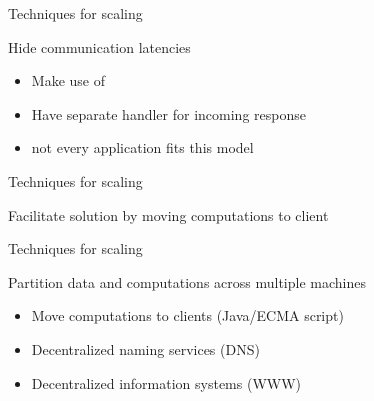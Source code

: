 \begin{slide}{Techniques for scaling}
  \begin{block}{Hide communication latencies}
    \begin{itemize}
    \item Make use of 
    \item Have separate handler for incoming response
    \item {} not every application fits this model
    \end{itemize}
  \end{block}
\end{slide}
\begin{slide}{Techniques for scaling}
  \begin{block}{Facilitate solution by moving computations to client}
    \begin{center}
       \newline
       \newline
    \end{center}
  \end{block}
\end{slide}
\begin{slide}{Techniques for scaling}
  \begin{block}{Partition data and computations across multiple machines}
    \begin{itemize}
    \item Move computations to clients (Java/ECMA script)
    \item Decentralized naming services (DNS)
    \item Decentralized information systems (WWW)
    \end{itemize}
  \end{block}
\end{slide}
